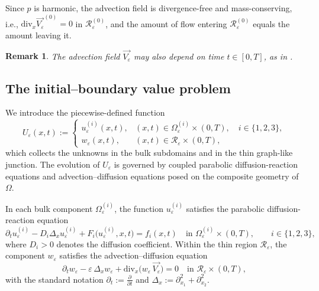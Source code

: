 \documentclass[reqno]{amsart}            %
\newtheorem{remark}{Remark}[section]
\numberwithin{equation}{section}
\begin{document}
	Since $p$ is harmonic, the advection field is divergence-free and mass-conserving, i.e.,
	$\mathrm{div}_x\overrightarrow{V_\varepsilon}^{(0)}=0$ in
	$\mathcal{R}_\varepsilon^{(0)}$, and the amount of flow entering $\mathcal{R}_\varepsilon^{(0)}$
	equals the amount leaving it.
	\begin{remark}
		The advection field $\overrightarrow{V_\varepsilon}$ may also depend on time
		$t\in[0,T]$, as in \cite{Mel-Roh_JMAA-2024}.
	\end{remark}
	
	
	\subsection{The initial–boundary value problem}\label{ibvp}
	
	We introduce the piecewise-defined function
	\begin{equation}\label{orig-solution}
		U_\varepsilon(x,t):=
		\begin{cases}
			u_\varepsilon^{(i)}(x,t), & (x,t)\in\Omega_\varepsilon^{(i)}\times(0,T),\quad i\in\{1,2,3\},
			\\[3pt]
			w_\varepsilon(x,t), & (x,t)\in\mathcal{R}_\varepsilon\times(0,T),
		\end{cases}
	\end{equation}
	which collects the unknowns in the bulk subdomains and in the thin graph-like junction.
	The evolution of $U_\varepsilon$ is governed by coupled parabolic diffusion-reaction equations and advection–diffusion
	equations posed on the composite geometry of $\Omega$.
	
	In each bulk component $\Omega_{\varepsilon}^{(i)}$, the function
	$u_\varepsilon^{(i)}$ satisfies the parabolic diffusion-reaction equation
	\begin{equation}\label{p-equations}
		\partial_t u_\varepsilon^{(i)} - D_i \Delta_x u_\varepsilon^{(i)}
		+ F_i\big(u_\varepsilon^{(i)}, x, t\big) = f_i(x,t)
		\quad \text{in } \Omega_\varepsilon^{(i)}\times(0,T),\qquad i\in\{1,2,3\},
	\end{equation}
	where $D_i>0$ denotes the diffusion coefficient.
	Within the thin region $\mathcal{R}_\varepsilon$, the component $w_\varepsilon$
	satisfies the advection–diffusion equation
	\begin{equation}\label{p-equations+}
		\partial_t w_\varepsilon - \varepsilon\,\Delta_x w_\varepsilon
		+ \mathrm{div}_x\big(w_\varepsilon\,\overrightarrow{V_\varepsilon}\big)
		= 0
		\quad \text{in } \mathcal{R}_\varepsilon\times(0,T),
	\end{equation}
	with the standard notation
	$\partial_t := \frac{\partial}{\partial t}$ and
	$\Delta_x := \partial_{x_1}^2 + \partial_{x_2}^2$.
	
\end{document}

